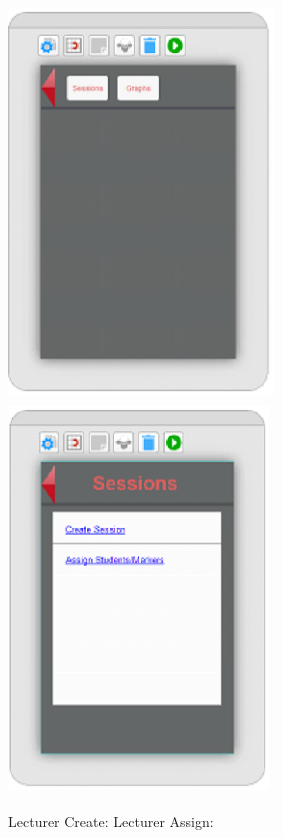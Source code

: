 \documentclass{article}
\begin{document}
\noindent \includegraphics*[width=2.78in, height=4.10in, keepaspectratio=false]{image19}      \includegraphics*[width=2.72in, height=4.06in, keepaspectratio=false]{image20}      

  Lecturer Create:     Lecturer Assign:
\end{document}
